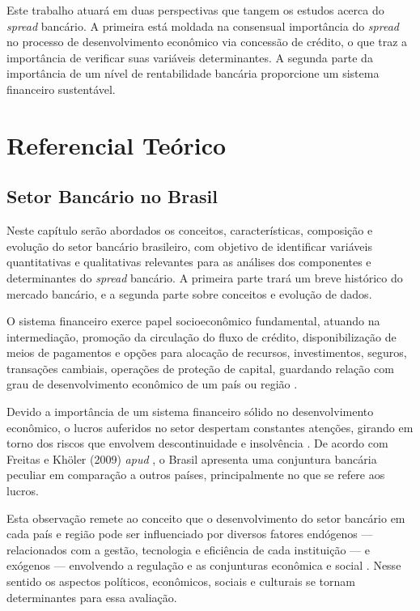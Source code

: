 \documentclass[
  12pt,
  12pt,
  openright,
  oneside,
  a4paper,
  chapter=TITLE,
  section=TITLE,
  subsection=TITLE,
  subsubsection=TITLE,
  english,
  portugues,
  sumario=tradicional]{abntex2}
\begin{document}
Este trabalho atuará em duas perspectivas que tangem os estudos acerca do \emph{spread} bancário. A primeira está moldada na consensual importância do \emph{spread} no processo de desenvolvimento econômico via concessão de crédito, o que traz a importância de verificar suas variáveis determinantes. A segunda parte da importância de um nível de rentabilidade bancária proporcione um sistema financeiro sustentável.

\textual
\pagestyle{simple}

\parindent 1.50cm

\chapter{Referencial Teórico}

\section{Setor Bancário no Brasil}

Neste capítulo serão abordados os conceitos, características, composição e evolução do setor bancário brasileiro, com objetivo de identificar variáveis quantitativas e qualitativas relevantes para as análises dos componentes e determinantes do \emph{spread} bancário. A primeira parte trará um breve histórico do mercado bancário, e a segunda parte sobre conceitos e evolução de dados.

O sistema financeiro exerce papel socioeconômico fundamental, atuando na intermediação, promoção da circulação do fluxo de crédito, disponibilização de meios de pagamentos e opções para alocação de recursos, investimentos, seguros, transações cambiais, operações de proteção de capital, guardando relação com grau de desenvolvimento econômico de um país ou região \cite{maffili:2009}.

Devido a importância de um sistema financeiro sólido no desenvolvimento econômico, o lucros auferidos no setor despertam constantes atenções, girando em torno dos riscos que envolvem descontinuidade e insolvência \cite{couto:2002}. De acordo com Freitas e Khöler (2009) \emph{apud} \textcite{dantas:2012}, o Brasil apresenta uma conjuntura bancária peculiar em comparação a outros países, principalmente no que se refere aos lucros.

Esta observação remete ao conceito que o desenvolvimento do setor bancário em cada país e região pode ser influenciado por diversos fatores endógenos --- relacionados com a gestão, tecnologia e eficiência de cada instituição --- e exógenos --- envolvendo a regulação e as conjunturas econômica e social \cite{rover:2011}. Nesse sentido os aspectos políticos, econômicos, sociais e culturais se tornam determinantes para essa avaliação.
\end{document}
